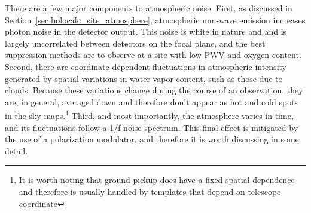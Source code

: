 There are a few major components to atmospheric noise. First, as discussed in Section~\ref{sec:bolocalc_site_atmosphere}, atmospheric mm-wave emission increases photon noise in the detector output. This noise is white in nature and and is largely uncorrelated between detectors on the focal plane, and the best suppression methods are to observe at a site with low PWV and oxygen content. Second, there are coordinate-dependent fluctuations in atmospheric intensity generated by spatial variations in water vapor content, such as those due to clouds. Because these variations change during the course of an observation, they are, in general, averaged down and therefore don't appear as hot and cold spots in the sky maps.\footnote{It is worth noting that ground pickup does have a fixed spatial dependence and therefore is usually handled by templates that depend on telescope coordinate} Third, and most importantly, the atmosphere varies in time, and its fluctuations follow a 1/f noise spectrum. This final effect is mitigated by the use of a polarization modulator, and therefore it is worth discussing in some detail.

